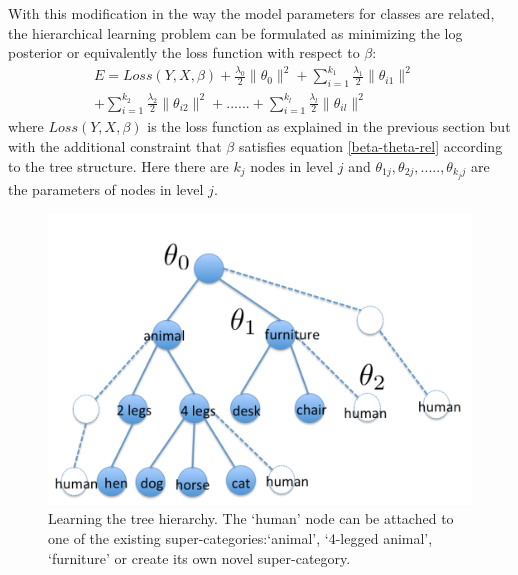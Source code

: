 \documentclass[10pt,twocolumn,letterpaper]{article}
\begin{document}
With this modification in the way the model parameters for classes are related,  the hierarchical 
learning problem can be formulated as minimizing the log posterior or equivalently the loss function 
with respect to $\beta$:
\begin{equation} \label{hier-loss}
  \begin{split}
    E = Loss(Y,X,\beta) + \frac{\lambda_{0}}{2} \|\theta_{0} \|^{2} +
    \sum_{i=1}^{k_{1}} \frac{\lambda_{1}}{2} \|\theta_{i1} \|^{2} & \\
    + \sum_{i=1}^{k_{2}} \frac{\lambda_{2}}{2} \|\theta_{i2} \|^{2} +
    ...... +
    \sum_{i=1}^{k_{l}} \frac{\lambda_{l}}{2} \|\theta_{il} \|^{2} &
  \end{split}
\end{equation} 
 where $Loss(Y,X,\beta)$ is the loss function as explained in the previous section
 but with the additional constraint that $\beta$ satisfies  equation \ref{beta-theta-rel} 
 according to the tree structure. Here there are $k_{j}$ nodes in level $j$ and 
 $\theta_{1j}, \theta_{2j},.....,\theta_{k_{j}j}$ are the parameters of nodes in level $j$.
\begin{figure}[t]
	\begin{center}
		\includegraphics[width=0.8\linewidth]{tree}
	\end{center}
	\caption{ Learning the tree hierarchy. The `human' node can be attached 
              to one of the existing super-categories:`animal', `4-legged animal', `furniture'
              or create its own novel super-category.}
	\label{fig:long}
	\label{fig:onecol}
\end{figure}
\end{document}
